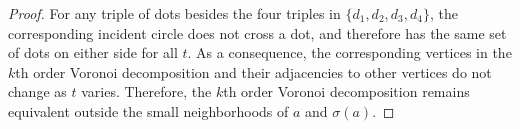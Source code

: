 \documentclass[11pt,oneside]{amsart}
\theoremstyle{definition}
\theoremstyle{remark}
\numberwithin{equation}{section}
\begin{document}
\begin{proof}
For any triple of dots besides the four triples in $\{d_1,d_2,d_3,d_4\}$, the corresponding incident circle does not cross a dot, and therefore has the same set of dots on either side for all $t$. As a consequence, the corresponding vertices in the $k$th order Voronoi decomposition and their adjacencies to other vertices do not change as $t$ varies. Therefore, the $k$th order Voronoi decomposition remains equivalent outside the small neighborhoods of $a$ and $\sigma(a)$.
%
%
%
%

\end{proof}
\end{document}
